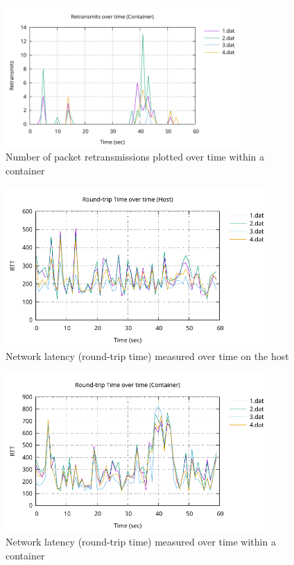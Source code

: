 \begin{figure}[H]
    \centering
    \includegraphics[width=0.8\textwidth]{images/results/network-retransmits-container.pdf}
    \caption{Number of packet retransmissions plotted over time within a container}
    \label{images:experiment/network-retransmits-container.pdf}
\end{figure}

\begin{figure}[H]
    \centering
    \includegraphics[width=0.9\textwidth]{images/results/network-host-rtt.pdf}
    \caption{Network latency (round-trip time) measured over time on the host}
    \label{images:experiment/network-host-rtt.pdf}
\end{figure}

\begin{figure}[H]
    \centering
    \includegraphics[width=0.9\textwidth]{images/results/network-rtt-container.pdf}
    \caption{Network latency (round-trip time) measured over time within a container}
    \label{images:experiment/network-rtt-container.pdf}
\end{figure}

